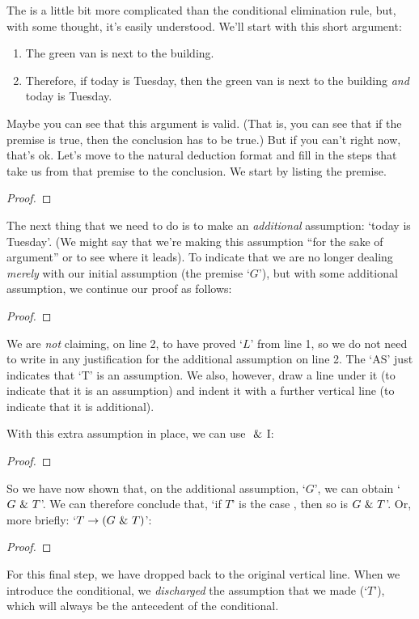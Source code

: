 The  is a little bit more complicated than the conditional elimination rule, but, with some thought, it's easily understood. We'll start with this short argument:
	\begin{enumerate}
\itemsep-1mm
\item	The green van is next to the building.
\item	Therefore, if today is Tuesday, then the green van is next to the building \emph{and} today is Tuesday.
	\end{enumerate}
Maybe you can see that this argument is valid. (That is, you can see that if the premise is true, then the conclusion has to be true.) But if you can't right now, that's ok. Let's move to the natural deduction format and fill in the steps that take us from that premise to the conclusion. We start by listing the premise.
	\begin{proof}
		 
	\end{proof}
The next thing that we need to do is to make an \emph{additional} assumption: `today is Tuesday'. (We might say that we're making this assumption ``for the sake of argument'' or to see where it leads). To indicate that we are no longer dealing \emph{merely} with our initial assumption (the premise `$G$'), but with some additional assumption, we continue our proof as follows:
	\begin{proof}
		 
		\open
			 
	\end{proof}
We are \emph{not} claiming, on line 2, to have proved `$L$' from line 1, so we do not need to write in any justification for the additional assumption on line 2. The `AS' just indicates that `T' is an assumption. We also, however, draw a line under it (to indicate that it is an assumption) and indent it with a further vertical line (to indicate that it is additional). 

With this extra assumption in place, we can use $~\&~$I:
	\begin{proof}
		 
		\open
			 
	\end{proof}
So we have now shown that, on the additional assumption, `$G$', we can obtain `$G ~\&~ T$'. We can therefore conclude that, `if $T$' is the case , then so is $G ~\&~ T$'. Or, more briefly: `$T \rightarrow (G ~\&~ T)$':
	\begin{proof}
		 
		\open
			 
			\close
	\end{proof}
For this final step, we have dropped back to the original vertical line. When we introduce the conditional, we \emph{discharged} the assumption that we made (`$T$'), which will always be the antecedent of the conditional.  

